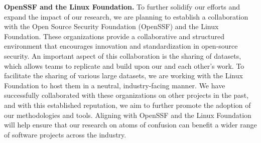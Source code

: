 \documentclass[conference]{IEEEtran}
\begin{document}
\textbf{OpenSSF and the Linux Foundation.}
%
To further solidify our efforts and expand the impact of our 
research, we are planning to establish a collaboration with 
the Open Source Security Foundation (OpenSSF) and the Linux 
Foundation. These organizations provide a collaborative and 
structured environment that encourages innovation and 
standardization in open-source security. An important aspect 
of this collaboration is the sharing of datasets, which allows 
teams to replicate and build upon our and each other's work. 
To facilitate the sharing of various large datasets, we are 
working with the Linux Foundation to host them in a neutral, 
industry-facing manner. We have successfully collaborated with 
these organizations on other projects in the past, and with 
this established reputation, we aim to further promote the 
adoption of our methodologies and tools. Aligning with OpenSSF 
and the Linux Foundation will help ensure that our research on 
atoms of confusion can benefit a wider range of software 
projects across the industry.

{\scriptsize  }
\end{document}
